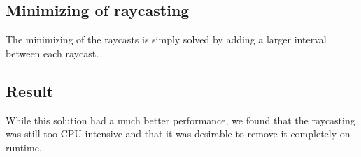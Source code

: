 \subsection*{Minimizing of raycasting}
The minimizing of the raycasts is simply solved by adding a larger interval between each raycast.

\subsection*{Result}
While this solution had a much better performance, we found that the raycasting was still too CPU intensive and that it was desirable to remove it completely on runtime.